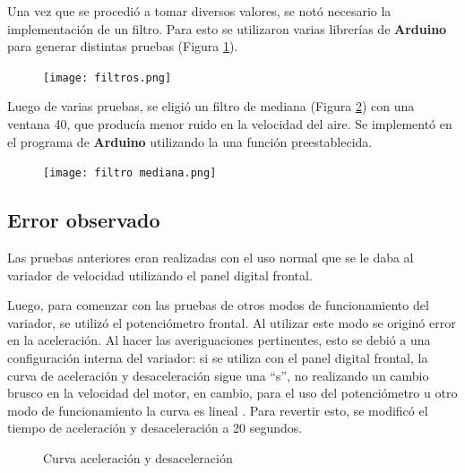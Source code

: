 Una vez que se procedió a tomar diversos valores, se notó necesario la implementación de un filtro. Para esto se utilizaron varias librerías de \textbf{Arduino} para generar distintas pruebas (Figura \ref{fig:filtros}).

\begin{figure}[!h]
	\centering
	\texttt{[image: filtros.png]}
	\label{fig:filtros}
\end{figure}

Luego de varias pruebas, se eligió un filtro de mediana (Figura \ref{fig:filtrosm}) con una ventana 40, que producía menor ruido en la velocidad del aire. Se implementó en el programa de \textbf{Arduino} utilizando la una función preestablecida.

\begin{figure}[htb]
	\centering
	\texttt{[image: filtro mediana.png]}
	\label{fig:filtrosm}
\end{figure}


\subsection{Error observado}
Las pruebas anteriores eran realizadas con el uso normal que se le daba al variador de velocidad utilizando el panel digital frontal.

Luego, para comenzar con las pruebas de otros modos de funcionamiento del variador, se utilizó el potenciómetro frontal. Al utilizar este modo se originó error en la aceleración.   Al hacer las averiguaciones pertinentes, esto se debió a una configuración interna del variador: si se utiliza con el panel digital frontal, la curva de aceleración y desaceleración sigue una “s”, no realizando un cambio brusco en la velocidad del motor, en cambio, para el uso del potenciómetro u otro modo de funcionamiento la curva es lineal . Para revertir esto, se modificó el tiempo de aceleración y desaceleración a 20 segundos.

\begin{figure}[htbp]
	\centering
	\caption{Curva aceleración y desaceleración} \label{fig:curva}
\end{figure}

\newpage
